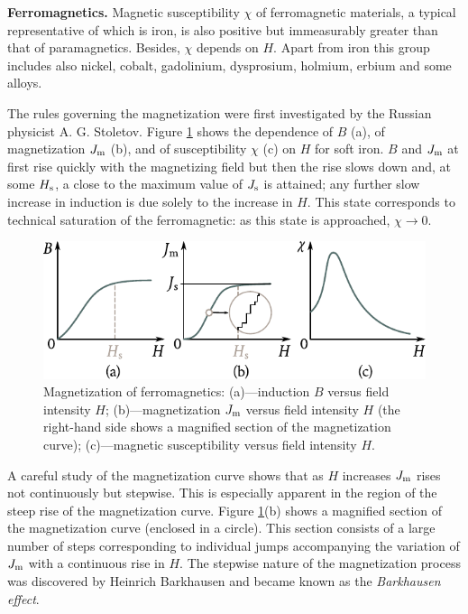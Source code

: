 \textbf{Ferromagnetics.} Magnetic susceptibility $\chi$ of ferromagnetic materials, a typical representative of which is iron, is also positive but immeasurably greater than that of paramagnetics. Besides, $\chi$ depends on $H$. Apart from iron this group includes also nickel, cobalt, gadolinium, dysprosium, holmium, erbium and some alloys.

The rules governing the magnetization were first investigated by the Russian physicist A. G. Stoletov. Figure \ref{fig:7_2} shows the dependence
of $B$ (a), of magnetization $J_{\text{m}}$ (b), and of susceptibility $\chi$ (c) on $H$ for soft iron. $B$ and $J_{\text{m}}$ at first rise quickly with the magnetizing field but then the rise slows down and, at some $H_{\text{s}}$, a close to the maximum value of $J_{\text{s}}$ is attained; any further slow increase
in induction is due solely to the increase in $H$. This state corresponds to technical saturation of the ferromagnetic: as this state is approached, $\chi\to 0$.

\begin{figure}[t]
	\begin{center}
		\includegraphics[scale=1]{figures/ch_07/fig_7_2.pdf}
		\caption[]{Magnetization of ferromagnetics: (a)---induction $B$ versus field intensity $H$; (b)---magnetization $J_{\text{m}}$ versus field intensity $H$ (the right-hand side shows a magnified section of the magnetization curve); (c)---magnetic susceptibility versus field intensity $H$.}
		\label{fig:7_2}
	\end{center}
	\vspace{-0.7cm}
\end{figure}

A careful study of the magnetization curve shows that as $H$ increases $J_{\text{m}}$ rises not continuously but stepwise. This is especially apparent in the region of the steep rise of the magnetization curve. Figure \ref{fig:7_2}(b) shows a magnified section of the magnetization curve (enclosed in a circle). This section consists of a large number of steps corresponding to individual jumps accompanying the variation of $J_{\text{m}}$ with a continuous rise in $H$. The stepwise nature of the magnetization process was discovered by Heinrich Barkhausen and became known as the \textit{Barkhausen effect}.

